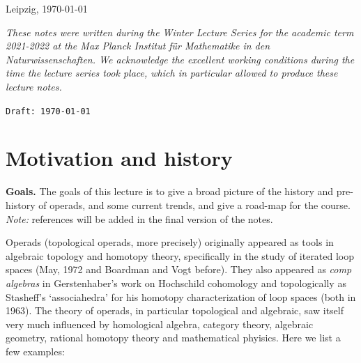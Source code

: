 \documentclass[fleqn, a4paper, twoside]{article}
\newcommand{\0}{\langle 0\rangle}
\DeclareRobustCommand{\[}{\begin{equation}}%
\DeclareRobustCommand{\]}{\end{equation}}%
\theoremstyle{mytheorem}
\theoremstyle{introthm}
\theoremstyle{mydefinition}
\theoremstyle{mydefinition2}
\theoremstyle{plain} %
\newcommand{\?}{\,?\,}
\theoremstyle{mytheorem}
\theoremstyle{plain} %
\newcommand\blankpage{%
    \null
    \thispagestyle{empty}%
    \newpage}
\begin{document}
\vfill

\hfill	Leipzig, \today


\afterpage{\blankpage}

\newpage

\vspace*{\fill} 
\emph{These notes were written during the Winter Lecture
Series for the academic term 2021-2022 at the \emph{Max
Planck Institut f\"ur Mathematike in den Naturwissenschaften}.
We acknowledge the excellent working
conditions during the time the lecture series took place,
which in particular allowed to produce these lecture notes. }
\vspace*{\fill} 
 \afterpage{\blankpage}

\newpage

\thispagestyle{empty}

\tableofcontents

\vfill

\hfill \texttt{Draft: \today} 

\afterpage{\blankpage}

\pagebreak

\thispagestyle{empty}


\section{Motivation and history}\label{section:theintro}
 
\textbf{Goals.} The goals of this lecture is to
give a broad picture of the history and 
pre-history of operads, and some current trends,
and give a road-map for the course.  
 \emph{Note:} references will be
 added in the final version of the notes.
  
Operads (topological operads, more precisely)
originally appeared as tools in algebraic
topology and homotopy theory, 
specifically in the study of iterated loop 
spaces (May, 1972 and Boardman and Vogt before).
They also appeared as \emph{comp algebras} in Gerstenhaber's 
work on Hochschild cohomology and topologically as 
Stasheff's `associahedra' for his homotopy
characterization of loop spaces (both in 1963).
The theory of operads, in particular topological
and algebraic, saw itself very much influenced by
homological algebra, category theory, algebraic
geometry, rational homotopy theory and mathematical
phyisics. Here we list a few examples:
\end{document}
